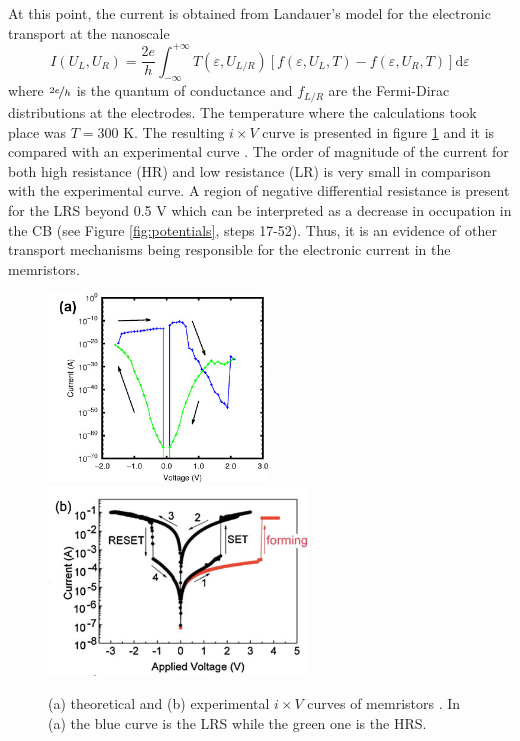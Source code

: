 At this point, the current is obtained from Landauer's model for the electronic transport at the nanoscale \cite{Datta}
 \begin{equation}
	I(U_L,U_R) = \frac{2e}{h} \int_{-\infty}^{+\infty}T(\varepsilon,U_{L/R}) \left[f(\varepsilon,U_L,T)-f(\varepsilon,U_R,T)\right] \mathrm{d}\varepsilon
\end{equation}
where $\nicefrac{2e}{h}$ is the quantum of conductance and $f_{L/R}$ are the Fermi-Dirac distributions at the electrodes. The temperature where the calculations took place was $T= 300$ K. The resulting $i \times V$ curve is presented in figure \ref{fig:ixvtheo-01} and it is compared with an experimental curve \cite{Pan2014}. The order of magnitude of the current for both high resistance (HR) and low resistance (LR) is very small in comparison with the experimental curve. A region of negative differential resistance is present for the LRS beyond 0.5 V which can be interpreted as a decrease in occupation in the CB (see Figure \ref{fig:potentials}, steps 17-52). Thus, it is an evidence of other transport mechanisms being responsible for the electronic current in the memristors.
\begin{center}
  \begin{figure}[h!]
    \begin{center}
      \includegraphics[height=5cm]{img/ixv-tunnel.jpg}    
      \includegraphics[height=5cm]{img/pan.jpg}    
      \caption{(a) theoretical and (b) experimental $i \times V$ curves of memristors \cite{Yang2009}. In (a) the blue curve is the LRS while the green one is the HRS.} 
      \label{fig:ixvtheo-01} 
    \end{center}
  \end{figure}
\end{center}

